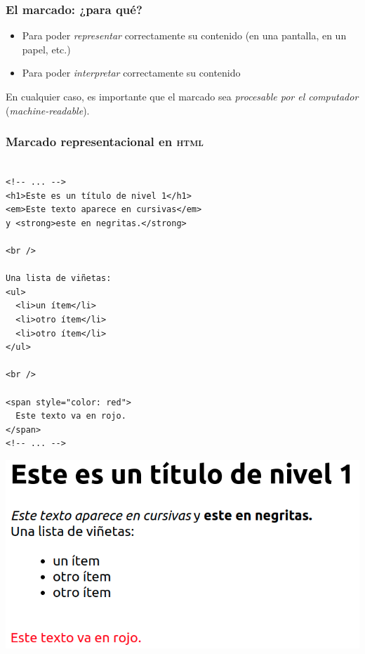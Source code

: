 \documentclass[%
  handout, %
  ]{beamer}
\newcommand*{\rojoit}[1]{\textit{\textcolor[HTML]{8B0000}{#1}}}
\begin{document}


\begin{frame}
  \frametitle{El marcado: ¿para qué?}
  \begin{itemize}
    \item Para poder \rojoit{representar} correctamente su contenido (en una pantalla, en un papel, etc.)
    \item Para poder \rojoit{interpretar} correctamente su contenido
  \end{itemize}

  \bigskip

  En cualquier caso, es importante que el marcado sea \textit{procesable por el computador} (\textit{machine-readable}).
  
\end{frame}



\begin{frame}[fragile]
  \frametitle{Marcado representacional en \textsc{html}}

  \begin{minipage}[c]{0.5\linewidth}
\scriptsize
\begin{verbatim}
  
<!-- ... -->  
<h1>Este es un título de nivel 1</h1>
<em>Este texto aparece en cursivas</em>
y <strong>este en negritas.</strong>

<br />

Una lista de viñetas:
<ul>
  <li>un ítem</li>
  <li>otro ítem</li>
  <li>otro ítem</li>
</ul>

<br />

<span style="color: red">
  Este texto va en rojo.
</span>
<!-- ... --> 
    \end{verbatim}
  \end{minipage}%
  \begin{minipage}[t][\textwidth][t]{0.5\linewidth}
    \includegraphics[width=\textwidth]{img/html.png}
  \end{minipage}
    
\end{frame}
\end{document}
